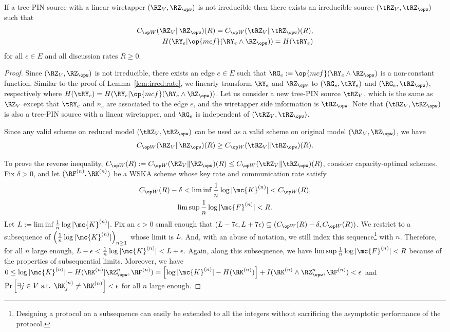 \begin{lemma}\label{lem:irred:rate} 
 If a tree-PIN source with a linear wiretapper $(\RZ_V,\RZ_{\opw})$ is not irreducible then there exists an irreducible source $(\tRZ_V, \tRZ_{\opw})$ such that 
 \begin{align*}
\wskc(\RZ_V\| \RZ_{\opw})(R) = \wskc(\tRZ_V\|\tRZ_{\opw})(R),\\ 
H(\RY_e|\op{mcf}(\RY_e\wedge\RZ_{\opw})) = H(\tRY_e)
\end{align*}
for all $e \in E$ and all discussion rates $R \geq 0$.
\end{lemma}
\begin{proof}
Since $(\RZ_V, \RZ_{\opw})$ is not irreducible, there exists an edge $e \in E$ such that $\RG_e := \op{mcf}(\RY_e\wedge \RZ_{\opw})$ is a non-constant function. Similar to the proof of Lemma~\ref{lem:irred:rate}, we linearly transform $\RY_e$ and $\RZ_{\opw}$ to  $(\RG_e, \tRY_e)$ and $(\RG_e, \tRZ_{\opw} )$, respectively where $ H(\tRY_e)=H(\RY_e|\op{mcf}(\RY_e\wedge\RZ_{\opw}))$. Let us consider a  new tree-PIN  source $\tRZ_V$, which is the same as $\RZ_V$ except that  $\tRY_e$ and $\tilde{n}_e$ are associated to the edge $e$, and the wiretapper side information is  $\tRZ_{\opw}$. Note that $(\tRZ_V, \tRZ_{\opw})$ is also a tree-PIN source with a linear wiretapper, and $\RG_e$ is independent of $(\tRZ_V, \tRZ_{\opw})$.

Since any valid scheme on reduced model $(\tRZ_V, \tRZ_{\opw})$ can be used as a valid scheme on original model $(\RZ_V, \RZ_{\opw})$, we have 
$$\wskc(\RZ_V\| \RZ_{\opw})(R) \geq \wskc(\tRZ_V\|\tRZ_{\opw})(R).$$

To prove the reverse inequality, $\wskc(R):=\wskc(\RZ_V\| \RZ_{\opw})(R) \leq \wskc(\tRZ_V\|\tRZ_{\opw})(R)$, consider capacity-optimal schemes. Fix $\delta>0$, and let $(\RF^{(n)},\RK^{(n)})$ be a WSKA scheme whose key rate and communication rate satisfy
\begin{gather}
    \wskc(R)-\delta < \liminf \frac{1}{n}\log|\mc{K}^{(n)}| < \wskc(R), \label{eq:rate_k}\\
    \limsup \frac{1}{n}\log|\mc{F}^{(n)}| < R. \nonumber
\end{gather}
Let $L:=\liminf \frac{1}{n}\log|\mc{K}^{(n)}|$. Fix an $\epsilon>0$ small enough that $(L-7\epsilon, L+7\epsilon) \subseteq (\wskc(R)-\delta, \wskc(R))$.
We restrict to a subsequence of $\left(\frac{1}{n}\log|\mc{K}^{(n)}|\right)_{n\geq 1}$ whose limit is $L$. And, with an abuse of notation, we still index this sequence\footnote{Designing a protocol on a subsequence can easily be extended to all the integers without sacrificing the asymptotic performance of the protocol.} with $n$. Therefore, for all $n$ large enough,  $L-\epsilon <\frac{1}{n}\log|\mc{K}^{(n)}| < L+\epsilon$. Again, along this subsequence, we have $\limsup \frac{1}{n}\log|\mc{F}^{(n)}| < R$ because of the properties of subsequential limits. Moreover, we have  $0 \leq \log|\mc{K}^{(n)}|-H(\RK^{(n)}|\RZ^n_{\opw},\RF^{(n)})=\left[\log|\mc{K}^{(n)}|-H(\RK^{(n)})\right] +I(\RK^{(n)} \wedge \RZ^n_{\opw},\RF^{(n)})< \epsilon$ and $\Pr\left[ \exists j\in V \text{ s.t. }  \RK_j^{(n)}\neq \RK^{(n)}\right]< \epsilon$ for all $n$ large enough.


\end{proof}

